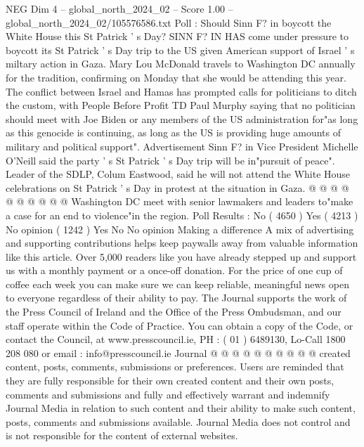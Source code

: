 \begin{textsample}{NEG Dim 4 – global\_north\_2024\_02 – Score 1.00 – global\_north\_2024\_02/105576586.txt}  \label{ex:f4_neg_282}
Poll : Should Sinn F? in boycott the White House this St Patrick ' s Day?
SINN F?
IN HAS come under pressure to boycott its St Patrick ' s Day trip to the US given American support of Israel ' s miltary action in Gaza.
Mary Lou McDonald travels to Washington DC annually for the tradition, confirming on Monday that she would be attending this year.
The conflict between Israel and Hamas has prompted calls for politicians to ditch the custom, with People Before Profit TD Paul Murphy saying that no politician should meet with Joe Biden or any members of the US administration for"as long as this genocide is continuing, as long as the US is providing huge amounts of military and political support".
Advertisement Sinn F? in Vice President Michelle O'Neill said the party ' s St Patrick ' s Day trip will be in"pursuit of peace".
Leader of the SDLP, Colum Eastwood, said he will not attend the White House celebrations on St Patrick ' s Day in protest at the situation in Gaza. @ @ @ @ @ @ @ @ @ @ Washington DC meet with senior lawmakers and leaders to"make a case for an end to violence"in the region.
Poll Results : No ( 4650 ) Yes ( 4213 ) No opinion ( 1242 ) Yes No No opinion Making a difference A mix of advertising and supporting contributions helps keep paywalls away from valuable information like this article.
Over 5,000 readers like you have already stepped up and support us with a monthly payment or a once-off donation.
For the price of one cup of coffee each week you can make sure we can keep reliable, meaningful news open to everyone regardless of their ability to pay.
The Journal supports the work of the Press Council of Ireland and the Office of the Press Ombudsman, and our staff operate within the Code of Practice.
You can obtain a copy of the Code, or contact the Council, at www.presscouncil.ie, PH : ( 01 ) 6489130, Lo-Call 1800 208 080 or email : info@presscouncil.ie Journal @ @ @ @ @ @ @ @ @ @ created content, posts, comments, submissions or preferences.
Users are reminded that they are fully responsible for their own created content and their own posts, comments and submissions and fully and effectively warrant and indemnify Journal Media in relation to such content and their ability to make such content, posts, comments and submissions available.
Journal Media does not control and is not responsible for the content of external websites.

\end{textsample}
